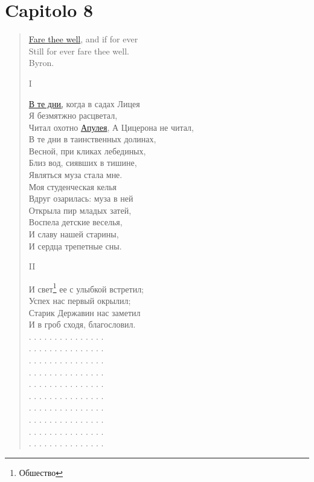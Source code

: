 \chapter{Capitolo 8}\label{section:cap8}%

\begin{verse}

\hyperref[sec:fare]{Fare thee well}, and if for ever\\
Still for ever fare thee well.\\
Byron.

I

\hyperref[sec:musa]{В те дни,} когда в садах Лицея\\
Я безмятжно расцветал,\\
Читал охотно \hyperref[apuleia]{Апулея},
А Цицерона не читал,\\
В те дни в таинственных долинах,\\
Весной, при кликах лебединых,\\
Близ вод, сиявших в тишине,\\
Являться муза стала мне.\\
Моя студенческая келья\\
Вдруг озарилась: муза в ней\\
Открыла пир младых затей,\\
Воспела детские веселья,\\
И славу нашей старины,\\
И сердца трепетные сны.

II

И свет\footnote{Обшество} ее с улыбкой встретил;\\
Успех нас первый окрылил;\\
Старик Державин нас заметил\\
И в гроб сходя, благословил.\\
. . . . . . . . . . . . . . .\\
. . . . . . . . . . . . . . .\\
. . . . . . . . . . . . . . .\\
. . . . . . . . . . . . . . .\\
. . . . . . . . . . . . . . .\\
. . . . . . . . . . . . . . .\\
. . . . . . . . . . . . . . .\\
. . . . . . . . . . . . . . .\\
. . . . . . . . . . . . . . .\\
. . . . . . . . . . . . . . .


\end{verse}
